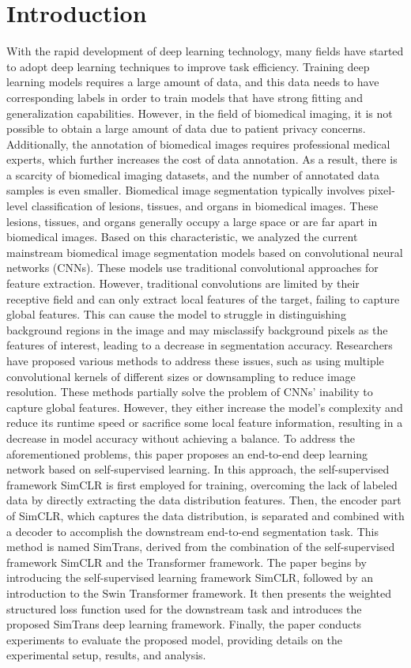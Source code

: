 \documentclass[10pt,twocolumn,letterpaper]{article}
\begin{document}
\section{Introduction}
\label{sec:intro}

With the rapid development of deep learning technology, many fields have started to adopt deep learning techniques to improve task efficiency. Training deep learning models requires a large amount of data, and this data needs to have corresponding labels in order to train models that have strong fitting and generalization capabilities. However, in the field of biomedical imaging, it is not possible to obtain a large amount of data due to patient privacy concerns. Additionally, the annotation of biomedical images requires professional medical experts, which further increases the cost of data annotation. As a result, there is a scarcity of biomedical imaging datasets, and the number of annotated data samples is even smaller.
Biomedical image segmentation typically involves pixel-level classification of lesions, tissues, and organs in biomedical images. These lesions, tissues, and organs generally occupy a large space or are far apart in biomedical images. Based on this characteristic, we analyzed the current mainstream biomedical image segmentation models based on convolutional neural networks (CNNs). These models use traditional convolutional approaches for feature extraction. However, traditional convolutions are limited by their receptive field and can only extract local features of the target, failing to capture global features. This can cause the model to struggle in distinguishing background regions in the image and may misclassify background pixels as the features of interest, leading to a decrease in segmentation accuracy. Researchers have proposed various methods to address these issues, such as using multiple convolutional kernels of different sizes or downsampling to reduce image resolution. These methods partially solve the problem of CNNs' inability to capture global features. However, they either increase the model's complexity and reduce its runtime speed or sacrifice some local feature information, resulting in a decrease in model accuracy without achieving a balance.
To address the aforementioned problems, this paper proposes an end-to-end deep learning network based on self-supervised learning. In this approach, the self-supervised framework SimCLR is first employed for training, overcoming the lack of labeled data by directly extracting the data distribution features. Then, the encoder part of SimCLR, which captures the data distribution, is separated and combined with a decoder to accomplish the downstream end-to-end segmentation task. This method is named SimTrans, derived from the combination of the self-supervised framework SimCLR and the Transformer framework.
The paper begins by introducing the self-supervised learning framework SimCLR, followed by an introduction to the Swin Transformer framework. It then presents the weighted structured loss function used for the downstream task and introduces the proposed SimTrans deep learning framework. Finally, the paper conducts experiments to evaluate the proposed model, providing details on the experimental setup, results, and analysis.
\end{document}
